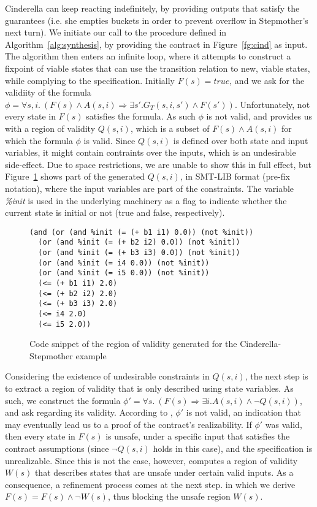 Cinderella can keep reacting indefinitely, by providing outputs that satisfy the
guarantees (i.e. she empties buckets in order to prevent overflow in Stepmother's next turn).
We initiate our call to the procedure defined in Algorithm~\ref{alg:synthesis},
by providing the contract in Figure~\ref{fg:cind} as input. The algorithm
then enters an infinite loop, where it attempts to construct a fixpoint of
viable states that can use the transition relation to new, viable states,
while complying to the specification. Initially $F(s) = true$, and we ask \aeval for the validiity of the formula $\phi = \forall s,i. \ (F(s) \land A(s,i) \Rightarrow \exists s'.G_{T}(s,i,s') \land F(s'))$. Unfortunately, not every state in $F(s)$
satisfies the formula. As such $\phi$ is not valid, and \aeval provides us with
a region of validity $Q(s,i)$, which is a subset of $F(s) \land A(s,i)$ for
which the formula $\phi$ is valid. Since $Q(s,i)$ is defined over both state and
input variables, it might contain contraints over the inputs, which is an
undesirable side-effect. Due to space restrictions, we are unable to show this
in full effect, but Figure~\ref{fg:snippet} shows part of the generated
$Q(s,i)$, in SMT-LIB format (pre-fix notation), where the input variables are
part of the constraints. The variable \textit{\%init} is used in the underlying
machinery as a flag to indicate whether the current state is initial or not
(true and false, respectively).

\begin{figure}[!t]
\centering
 \begin{Verbatim}[fontsize=\footnotesize]
(and (or (and %init (= (+ b1 i1) 0.0)) (not %init))
  (or (and %init (= (+ b2 i2) 0.0)) (not %init))
  (or (and %init (= (+ b3 i3) 0.0)) (not %init))
  (or (and %init (= i4 0.0)) (not %init))
  (or (and %init (= i5 0.0)) (not %init))
  (<= (+ b1 i1) 2.0)
  (<= (+ b2 i2) 2.0)
  (<= (+ b3 i3) 2.0)
  (<= i4 2.0)
  (<= i5 2.0))
 \end{Verbatim}
\caption{Code snippet of the region of validity generated for the Cinderella-Stepmother
example}
\label{fg:snippet}
\end{figure}

Considering the existence of undesirable constraints in $Q(s,i)$, the next step
is to extract a region of validity that is only described using state variables.
As such, we construct the formula $\phi' = \forall s. \ (F(s) \Rightarrow \exists
i. A(s,i) \land \lnot Q(s,i))$, and ask \aeval regarding its validity. According
to \aeval, $\phi'$ is not valid, an indication that may eventually lead us to a
proof of the contract's realizability. If $\phi'$ was valid, then every state in
$F(s)$ is unsafe, under a specific input that satisfies the contract
assumptions (since $\lnot Q(s,i)$ holds in this case), and the specification is unrealizable. Since this is not the case,
however, \aeval computes a region of validity $W(s)$ that describes states that are unsafe under certain valid inputs. As a consequence, a refinement process comes at the next step. in which we derive $F(s) = F(s) \land \lnot W(s)$, thus blocking the unsafe region $W(s)$.

